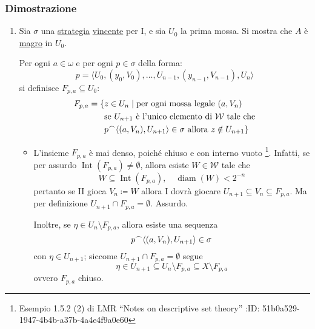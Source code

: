 \documentclass{article}
\newcommand{\1}{\mathds{1}}
\newcommand{\concat}{\null^{\frown}} %
\begin{document}
\subsubsection{Dimostrazione}
\label{sec:org842a52a}

\begin{enumerate}
\item Sia \(\sigma\) una \hyperref[sec:org1db90c5]{strategia} \hyperref[sec:org1db90c5]{vincente} per I, e sia \(U_{0}\) la prima mossa. Si mostra che \(A\) è \href{../../../../../../../org/roam/20250419122752-insieme_magro.org}{magro} in \(U_{0}\).

Per ogni \(a \in \omega\) e per ogni \(p \in \sigma\) della forma:
\begin{equation*}
 p=\langle
 	U_{0},({y}_{0}, V_{0}), \dots, U_{n-1}, ({y}_{n-1}, V_{n-1}), U_{n}
 \rangle
\end{equation*}
si definisce \(F_{p,a} \subseteq U_{0}\):
\begin{align*}
 F_{p,a} = \{&z \in U_{n}\mid \text{per ogni mossa legale }(a, V_{n})\\
 &\text{se } U_{n+1}\text{ è l'unico elemento di }\mathcal{W}\text{ tale che}\\
 &p \concat \langle(a,V_{n}), U_{n+1}\rangle \in \sigma \text{ allora } z \notin U_{n+1}\}
\end{align*}
\begin{itemize}
\item L'insieme \(F_{p,a}\) è mai denso, poiché chiuso e con interno vuoto \footnote{Esempio 1.5.2 (2) di LMR ``Notes on descriptive set theory''
:ID:       51b0a529-1947-4b4b-a37b-4a4e4f9a0e60}. Infatti, se per assurdo \(\operatorname{Int}(F_{p,a}) \neq \emptyset\), allora esiste \(W \in \mathcal{W}\) tale che
\begin{equation*}
   W \subseteq \operatorname{Int}(F_{p,a}), \quad \operatorname{diam}(W)<2^{-n}
\end{equation*}
pertanto se II gioca \(V_{n} \coloneqq W\) allora I dovrà giocare \(U_{n+1} \subseteq V_{n} \subseteq F_{p,a}\). Ma per definizione \(U_{n+1}\cap F_{p,a} = \emptyset\). Assurdo.

Inoltre, se \(\eta \in U_{n}\setminus F_{p,a}\), allora esiste una sequenza
\begin{equation*}
   p\concat\langle (a,V_{n}), U_{n+1}\rangle \in \sigma
\end{equation*}
con \(\eta \in U_{n+1}\); siccome \(U_{n+1} \cap F_{p,a} = \emptyset\) segue
\begin{equation*}
   \eta \in U_{n+1} \subseteq U_{n}\setminus F_{p,a} \subseteq X\setminus F_{p,a}
\end{equation*}
ovvero \(F_{p,a}\) chiuso.


\end{itemize}
\end{enumerate}
\end{document}
